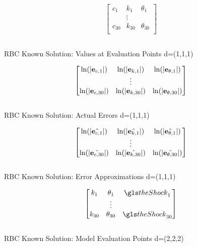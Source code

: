 \documentclass[12pt]{article}
\begin{document}
\begin{table}
  \centering
  
\begin{gather*}
  \begin{bmatrix}
    c_1&k_1&\theta_1\\
&\vdots\\
    c_{30}&k_{30}&\theta_{30}\\
  \end{bmatrix}\\
%  
\end{gather*}\\
  \caption{RBC Known Solution: Values at Evaluation Points \label{valatA} d=(1,1,1)}
\end{table}

 \begin{table}
    \centering
   \begin{gather*}
\forActErr\\
%  
   \end{gather*}\\
   \caption{RBC Known Solution: Actual Errors\label{acterrA} d=(1,1,1)}
 \end{table}

 \begin{table}
   \centering
  
   \begin{gather*}
\forEstErr\\
%   
   \end{gather*}\\
   \caption{RBC Known Solution: Error Approximations\label{esterrA} d=(1,1,1)}
 \end{table}


\begin{table}
  \centering
  
\begin{gather*}
  \begin{bmatrix}
    k_1&\theta_1&\theShock_1\\
&\vdots\\
    k_{30}&\theta_{30}&\theShock_{30}\\
  \end{bmatrix}\\
%  
\end{gather*}\\
  \caption{RBC Known Solution: Model Evaluation Points \label{evalpB} d=(2,2,2)}
\end{table}
\end{document}
